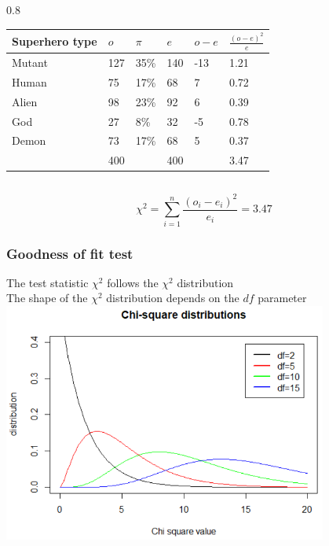 \documentclass{beamer}
\begin{document}
\begin{frame}
\begin{columns}
    \begin{column} { 0.8 \textwidth}
\begin{table}[h]
\begin{tabular}{@{}llllll@{}}
\toprule
\textbf{Superhero type} & \textbf{$o$} & \textbf{$\pi$} & \textbf{$e$} & \textbf{$o -e$} & \textbf{$\frac{(o-e)^{2}}{e}$} \\ \midrule
Mutant                  & 127          & 35\%           & 140          & -13             & 1.21                           \\
Human                    & 75           & 17\%           & 68           & 7               & 0.72                           \\
Alien                   & 98           & 23\%           & 92           & 6               & 0.39                           \\
God                     & 27           & 8\%            & 32           & -5              & 0.78                           \\
Demon                   & 73           & 17\%           & 68           & 5               & 0.37                           \\ \bottomrule
 & 400 & & 400 & & 3.47 \\
\end{tabular}
\end{table}
    \end{column}
  \end{columns}
  \[ \chi^{2} = \sum_{i=1}^{n} \frac{(o_{i} - e_{i})^{2}}{e_{i}} = 3.47\]
\end{frame}


\begin{frame}
  \frametitle{Goodness of fit test}
    The test statistic $\chi^{2}$ follows the $\chi^{2}$ distribution\\
    The shape of the $\chi^{2}$ distribution depends on the $df$ parameter
\vfill
    \includegraphics[width=0.8\textwidth]{img/chap6-chi-square-distributions.png}
\end{frame}
\end{document}
